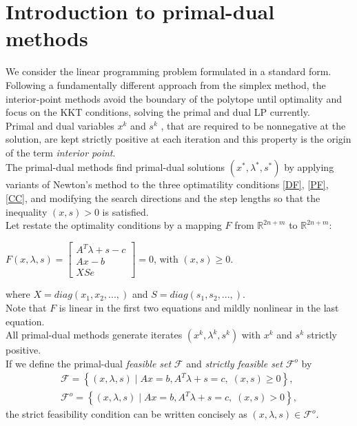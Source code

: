 \documentclass[a4paper,10 pt,titlepage,twoside]{book}
\theoremstyle{plain}
\theoremstyle{definition}
\theoremstyle{remark}
\begin{document}
\newpage
\section{Introduction to primal-dual methods}
We consider the linear programming problem formulated in a standard form. \\
Following a fundamentally different approach from the simplex method, the interior-point methods avoid the boundary of the polytope until optimality and focus on the KKT conditions, solving the primal and dual LP currently.\\
Primal and dual variables  $x^{k}$ and $s^{k}$ , that are required to be nonnegative at the solution, are kept strictly positive at each iteration and this property is the origin of the term \textit{interior point}.\\
The primal-dual methods find primal-dual solutions $(x^{*},\lambda^{*},s^{*})$ by applying variants of Newton's method to the three optimatility conditions \ref{DF}, \ref{PF}, \ref{CC}, and modifying the search directions and the step lengths so that the inequality $(x,s)>0$ is satisfied.\\
 Let restate the optimality conditions by a mapping $\mathit{F}$ from $\mathbb{R}^{2n+m}$ to $\mathbb{R}^{2n+m}$:
\begin{center}\label{F}
	$\mathit{F}(x,\lambda,s)= \begin{bmatrix}
	A^{T}\lambda+s-c \\Ax-b \\XSe
	\end{bmatrix}=0$, with $(x,s)\geq0.$
\end{center}
where $X = diag(x_{1}, x_{2},...,)$ and $S = diag(s_{1}, s_{2},...,)$.\\ Note that $\mathit{F}$ is linear in the first two equations and mildly nonlinear in the last equation. \\ All primal-dual methods generate iterates $(x^{k},\lambda^{k},s^{k})$ with $x^{k}$ and $s^{k}$ strictly positive.\\
If we define the primal-dual \textit{feasible set} $\mathcal{F}$ and \textit{strictly feasible set} $\mathcal{F}^{o}$ by
\begin{align*}
\mathcal{F} = \left\lbrace(x,\lambda,s)\;|\;Ax = b, A^{T}\lambda+s =c,\;(x,s)\geq0\right\rbrace, \\
\mathcal{F}^{o} = \left\lbrace(x,\lambda,s)\;|\;Ax = b, A^{T}\lambda+s =c,\;(x,s)>0\right\rbrace, 
\end{align*}
the strict feasibility condition can be written concisely as $(x,\lambda,s)\in\mathcal{F}^{o}$.\\
\end{document}
